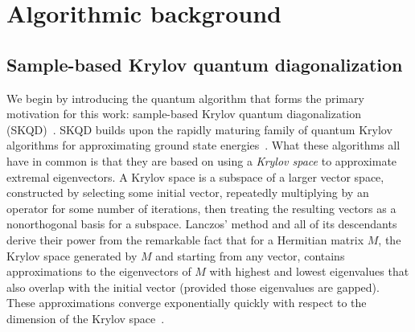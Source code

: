 \documentclass[
  reprint,            %
  amsmath,amssymb,
  aps,
  superscriptaddress, %
  longbibliography
]{revtex4-2}
\theoremstyle{definition}
\begin{document}
\section{Algorithmic background}
\label{sec:algorithms}

\subsection{Sample-based Krylov quantum diagonalization}
\label{sec:skqd_intro}

We begin by introducing the quantum algorithm that forms the primary motivation for this work: sample-based Krylov quantum diagonalization (SKQD)~\cite{yu2025quantum}.
SKQD builds upon the rapidly maturing family of quantum Krylov algorithms for approximating ground state energies~\cite{parrish2019quantum,motta2020qite_qlanczos,takeshita2020subspace,stair2020krylov,urbanek2020chemistry,kyriienko2020quantum,YeterAydeniz2020practical,cohn2021filterdiagonalization,yoshioka2021virtualsubspace,epperly2021subspacediagonalization,seki2021powermethod,bespalova2021hamiltonian,baker2021lanczos,baker2021block,cortes2022krylov,klymko2022realtime,tkachenko2024davidson,lee2023sampling,zhang2023measurementefficient,kirby2023exactefficient,shen2023realtimekrylov,yang2023dualgse,ohkura2023leveraging,motta2023subspace,getelina2024quantum,Filip2024variationalphase,anderson2024solving,kirby2024analysis,yoshioka2024diagonalization,byrne2024super,sugisaki2025hamiltonian,yu2025quantum}.
What these algorithms all have in common is that they are based on using a \emph{Krylov space} to approximate extremal eigenvectors.
A Krylov space is a subspace of a larger vector space, constructed by selecting some initial vector, repeatedly multiplying by an operator for some number of iterations, then treating the resulting vectors as a nonorthogonal basis for a subspace.
Lanczos' method and all of its descendants~\cite{lanczos1950iteration,saad2011numerical} derive their power from the remarkable fact that for a Hermitian matrix $M$, the Krylov space generated by $M$ and starting from any vector, contains approximations to the eigenvectors of $M$ with highest and lowest eigenvalues that also overlap with the initial vector (provided those eigenvalues are gapped).
These approximations converge exponentially quickly with respect to the dimension of the Krylov space~\cite{saad1980lanczos}.
\end{document}
